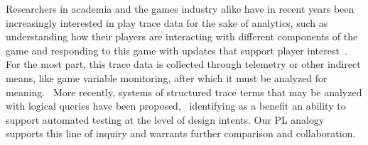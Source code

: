     Researchers in academia and the games industry alike have in recent
    years been increasingly interested in play trace data for the sake of
    analytics, such as understanding how their players are interacting with
    different components of the game and responding to this game with
    updates that support player interest~\cite{el2013game}. 
    For the most part, this trace data is collected through telemetry or
    other indirect means, like game variable monitoring, after which it
    must be analyzed for meaning.~\cite{Canossa2013} More recently,
    systems of structured trace terms that may be
    analyzed with logical queries have been
    proposed,~\cite{osborn2015playspecs} identifying as a benefit an
    ability to support automated testing at the level of design intents.
    Our PL analogy supports this line of inquiry and warrants
    further comparison and collaboration.

% 
% 
% 




